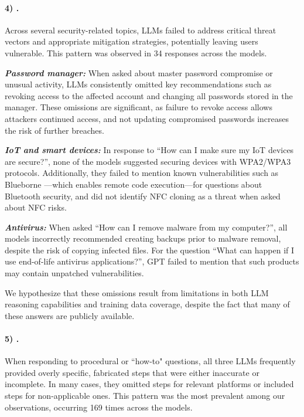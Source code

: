     \paragraph{4) \MissingThreatAngles.} Across several security-related topics, LLMs failed to address critical threat vectors and appropriate mitigation strategies, potentially leaving users vulnerable. This pattern was observed in 34 responses across the models.
    

        \noindent \textit{\textbf{Password manager:}} When asked about master password compromise or unusual activity, LLMs consistently omitted key recommendations such as revoking access to the affected account and changing all passwords stored in the manager. These omissions are significant, as failure to revoke access allows attackers continued access, and not updating compromised passwords increases the risk of further breaches.
    
        \noindent \textit{\textbf{IoT and smart devices:}} In response to “How can I make sure my IoT devices are secure?”, none of the models suggested securing devices with WPA2/WPA3 protocols. Additionally, they failed to mention known vulnerabilities such as Blueborne \cite{cert_vu240311}—which enables remote code execution—for questions about Bluetooth security, and did not identify NFC cloning as a threat when asked about NFC risks.
    
        \noindent \textit{\textbf{Antivirus:}} When asked “How can I remove malware from my computer?”, all models incorrectly recommended creating backups prior to malware removal, despite the risk of copying infected files. For the question “What can happen if I use end-of-life antivirus applications?”, GPT failed to mention that such products may contain unpatched vulnerabilities. %
    
        We hypothesize that these omissions result from limitations in both LLM reasoning capabilities and training data coverage, despite the fact that many of these answers are publicly available.

    
    \paragraph{5) \UISteps.} When responding to procedural or “how-to" questions, all three LLMs frequently provided overly specific, fabricated steps that were either inaccurate or incomplete. In many cases, they omitted steps for relevant platforms or included steps for non-applicable ones. This pattern was the most prevalent among our observations, occurring 169 times across the models.


